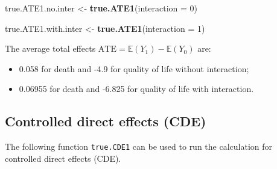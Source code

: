 \documentclass[
]{book}
\newenvironment{Shaded}{\begin{snugshade}}{\end{snugshade}}
\newcommand{\AttributeTok}[1]{\textcolor[rgb]{0.13,0.29,0.53}{#1}}
\newcommand{\DecValTok}[1]{\textcolor[rgb]{0.00,0.00,0.81}{#1}}
\newcommand{\FunctionTok}[1]{\textcolor[rgb]{0.13,0.29,0.53}{\textbf{#1}}}
\newcommand{\NormalTok}[1]{#1}
\newcommand{\OtherTok}[1]{\textcolor[rgb]{0.56,0.35,0.01}{#1}}
\providecommand{\tightlist}{%
  \setlength{\itemsep}{0pt}\setlength{\parskip}{0pt}}
\begin{document}
\begin{Shaded}
\begin{Highlighting}[]
\NormalTok{true.ATE1.no.inter }\OtherTok{\textless{}{-}} \FunctionTok{true.ATE1}\NormalTok{(}\AttributeTok{interaction =} \DecValTok{0}\NormalTok{)}

\NormalTok{true.ATE1.with.inter }\OtherTok{\textless{}{-}} \FunctionTok{true.ATE1}\NormalTok{(}\AttributeTok{interaction =} \DecValTok{1}\NormalTok{)}
\end{Highlighting}
\end{Shaded}

The average total effects \(\text{ATE} = \mathbb{E}(Y_1) - \mathbb{E}(Y_0)\) are:

\begin{itemize}
\tightlist
\item
  0.058 for death and -4.9 for quality of life without interaction;
\item
  0.06955 for death and -6.825 for quality of life with interaction.
\end{itemize}

\hypertarget{controlled-direct-effects-cde}{%
\subsection{Controlled direct effects (CDE)}\label{controlled-direct-effects-cde}}

The following function \texttt{true.CDE1} can be used to run the calculation for controlled direct effects (CDE).
\end{document}
